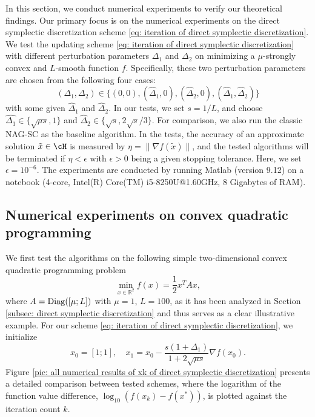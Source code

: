 \documentclass[11pt]{article}
\newcommand{\1}{\mathbf 1}
\numberwithin{equation}{section}
\begin{document}
In this section, we conduct numerical experiments to verify our theoretical findings. Our primary focus is on the numerical experiments on the direct symplectic discretization scheme \eqref{eq: iteration of direct symplectic discretization}. 
We test the updating scheme \eqref{eq: iteration of direct symplectic discretization} with different perturbation parameters $\Delta_1$ and $\Delta_2$ on minimizing a $\mu$-strongly convex and $L$-smooth function $f$. Specifically, these two perturbation parameters are chosen from the following four cases:
\[
(\Delta_1, \Delta_2) \in \{(0,0), (\widehat{\Delta}_1, 0), (\widehat{\Delta}_2, 0), (\widehat{\Delta}_1, \widehat{\Delta}_2) \}
\] 
with some given $\widehat{\Delta}_1$ and $\widehat{\Delta}_2$. In our tests, we set $s = 1/L$, and choose $\widehat{\Delta_1} \in \{\sqrt{\mu s}, 1 \}$ and $\widehat{\Delta}_2 \in \{ \sqrt{s}, 2\sqrt{s}/3\}$. For comparison, we also run the classic NAG-SC as the baseline algorithm. In the tests, the accuracy of an approximate solution $\tilde x \in \cH$ is measured by $\eta = \|\nabla f(\tilde x)\|$, and the tested algorithms will be terminated if $\eta < \epsilon$ with $\epsilon >0$ being a given stopping tolerance.
Here, we set $\epsilon = 10^{-6}$. The experiments are conducted by running Matlab (version {9.12}) on a notebook ({4}-core, {Intel(R) Core(TM) i5-8250U@1.60GHz, 8 Gigabytes of RAM}).


\subsection{Numerical experiments on convex quadratic programming}
\label{subsec: numerical experiments on convex quadratic programming problem}
We first test the algorithms on the following simple two-dimensional convex quadratic programming problem
\begin{equation}
    \label{eq: quadratic function for numerical experiments}
    \min_{x\in \mathbb{R}^2} f(x)=\frac{1}{2}x^TAx,
\end{equation}
where $A={\rm Diag}([\mu;L])$ with $\mu=1$, $L=100$, as it has been analyzed in Section \ref{subsec: direct symplectic discretization} and thus serves as a clear illustrative example.
For our scheme \eqref{eq: iteration of direct symplectic discretization}, we initialize  
\[
x_0 = [1;1], \quad x_1 = x_0 - \frac{s(1+\Delta_1)}{1+2\sqrt{\mu s}} \nabla f(x_0).
\]  
Figure \ref{pic: all numerical results of xk of direct symplectic discretization} presents a detailed comparison between tested schemes, where the logarithm of the function value difference, \(\log_{10}(f(x_k) - f(x^*))\), is plotted against the iteration count \(k\).  
\end{document}
